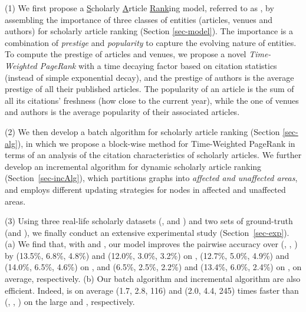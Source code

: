 \sstab(1) We first  propose a \underline{S}cholarly \underline{A}rticle \underline{Rank}ing model, referred to as \ensemblerank, by assembling the importance of three classes of entities (articles, venues and authors) for scholarly article ranking (Section \ref{sec-model}).
%
The importance is a combination of {\em prestige} and {\em popularity} to capture the evolving nature of entities.
%
To compute the prestige of articles and venues, we propose a novel {\em Time-Weighted PageRank} with a time decaying factor based on citation statistics (instead of simple exponential decay), and the prestige of authors is the average prestige of all their published articles.
%
The popularity of an article is the sum of all its citations' freshness (how close to the current year), while the one of venues and authors is the average popularity of their associated articles.
%
%

\sstab(2)  We then develop  a batch algorithm for scholarly article ranking (Section \ref{sec-alg}), in which we propose a block-wise method for Time-Weighted PageRank in terms of an analysis of the citation characteristics of scholarly articles.
%
We further develop an incremental algorithm for dynamic scholarly article ranking (Section~\ref{sec-incAlg}), which partitions graphs into  {\em affected and unaffected areas}, and employs different updating strategies for nodes in affected and unaffected areas.


\sstab(3) Using three real-life scholarly datasets (\aan, \aminer and \magdata) and two sets of ground-truth (\recom and \fcita), we finally conduct an extensive experimental study (Section~\ref{sec-exp}).
(a) We find that, with \recom and \fcita, our model \ensemblerank improves the pairwise accuracy \cite{Richardson06:BPR} over (\pagerank \cite{Brin98:PageRank}, \futurerank \cite{sayyadi09}, \hhgrank \cite{Liang16AAAI}) by
(13.5\%, 6.8\%, 4.8\%) and (12.0\%, 3.0\%, 3.2\%) on \aan,
(12.7\%, 5.0\%, 4.9\%) and (14.0\%, 6.5\%, 4.6\%) on \aminer, and
(6.5\%, 2.5\%, 2.2\%) and (13.4\%, 6.0\%, 2.4\%) on \magdata, on average, respectively.
%
(b) Our batch algorithm \batensemble and incremental algorithm \incensemble are also efficient. Indeed, \incensemble is on average (1.7, 2.8, 116) and (2.0, 4.4, 245) times faster than (\batensemble, \futurerank, \hhgrank)  on the large \aminer and \magdata, respectively.



